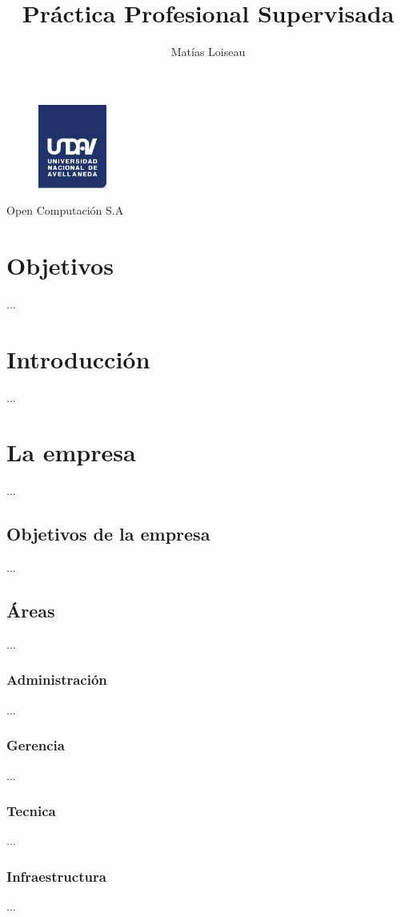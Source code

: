 \documentclass[12pt,a4paper]{article}
\author{Matías Loiseau}
\title{Práctica Profesional Supervisada}
\begin{document}
\begin{figure}
  \centering
   \includegraphics[width=0.2\textwidth]{undav-logo}
  \label{fig:ejemplo}
\end{figure}
\maketitle       %
\begin{center}
Open Computación S.A 
\end{center}
\cleardoublepage

\tableofcontents %
\cleardoublepage

\section{Objetivos}
...
\section{Introducción}
...
\section{La empresa}
...
\subsection{Objetivos de la empresa}
...
\subsection{Áreas}
...
\subsubsection{Administración}
...
\subsubsection{Gerencia}
...
\subsubsection{Tecnica}
...
\subsubsection{Infraestructura}
...
\end{document}
